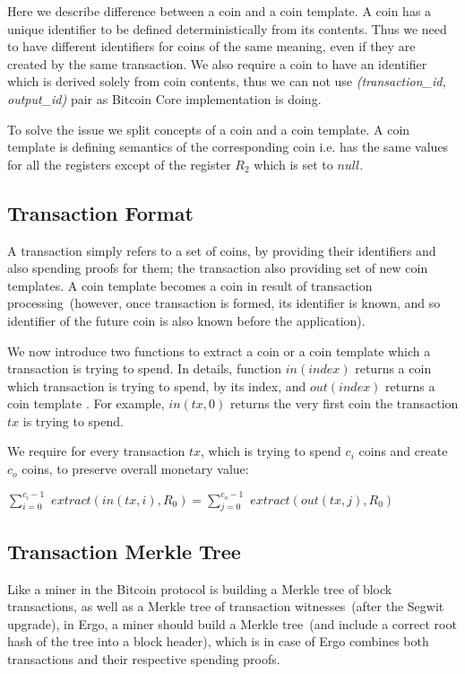\documentclass[]{article}   %
\newcommand{\coin}{coin}
\newcommand{\extract}[1]{$extract({#1})$}
\begin{document}
Here we describe difference between a \coin{} and a \coin{} template. A \coin{} has a unique identifier to be defined
deterministically from its contents. Thus we need to have different identifiers for \coin{}s of the same meaning, even
if they are created by the same transaction. We also require a \coin{} to have an identifier which is derived solely
from \coin{} contents, thus we can not use {\em (transaction\_id, output\_id)} pair as Bitcoin Core implementation is
doing.

To solve the issue we split concepts of a \coin{} and a \coin{} template. A \coin{} template is defining semantics of
the corresponding \coin{} i.e. has the same values for all the registers except of the register $R_2$ which is set to
$null$.


\subsection{Transaction Format}
\label{tx-format}

A transaction simply refers to a set of \coin{}s, by providing their identifiers and also spending proofs for
them; the transaction also providing set of new \coin{} templates. A \coin{} template becomes a \coin{} in result of
transaction processing~(however, once transaction is formed, its identifier is known, and so identifier of the future
coin is also known before the application).

We now introduce two functions to extract a \coin{} or a \coin{} template which a transaction is trying to spend.
 In details, function $in(index)$ returns a \coin{} which transaction is trying to spend, by its index, and $out(index)$
 returns a \coin{} template . For example, $in(tx, 0)$ returns the very first \coin{} the transaction $tx$ is trying to spend.

We require for every transaction $tx$, which is trying to spend $c_i$ {\coin}s and create $c_o$ coins,
to preserve overall monetary value:

$ \sum_{i=0}^{c_i - 1}$ \extract{in(tx,i), R_0}$ = \sum_{j=0}^{c_o - 1}$ \extract{out(tx,j), R_0}

\subsection{Transaction Merkle Tree}
\label{tx-tree}

Like a miner in the Bitcoin protocol is building a Merkle tree of block transactions, as well as a Merkle tree of
transaction witnesses~(after the Segwit upgrade), in Ergo, a miner should build a Merkle tree~(and include a correct
 root hash of the tree into a block header), which is in case of Ergo combines both transactions and their respective
 spending proofs.
\end{document}
